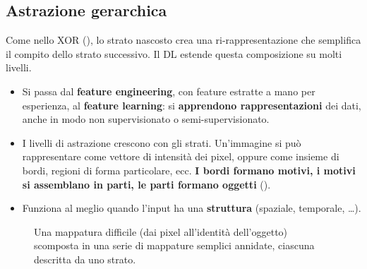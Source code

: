 \subsection{Astrazione gerarchica}

Come nello XOR (), lo strato nascosto crea una ri-rappresentazione che semplifica il compito dello
strato successivo. Il DL estende questa composizione su molti livelli.
\begin{itemize}
  \item Si passa dal \textbf{feature engineering}, con feature estratte a mano per esperienza, al \textbf{feature
        learning}: si \textbf{apprendono rappresentazioni} dei dati, anche in modo non supervisionato o
        semi-supervisionato.
  \item I livelli di astrazione crescono con gli strati. Un'immagine si può rappresentare come vettore di
        intensità dei pixel, oppure come insieme di bordi, regioni di forma particolare, ecc. \textbf{I bordi
        formano motivi, i motivi si assemblano in parti, le parti formano oggetti} ().
  \item Funziona al meglio quando l'input ha una \textbf{struttura} (spaziale, temporale, \dots).
\end{itemize}

\begin{figure}[ht]
\centering
{}
\caption{Una mappatura difficile (dai pixel all'identità dell'oggetto) scomposta in una serie di mappature semplici
annidate, ciascuna descritta da uno strato.}
\label{fig:gerarchia}
\end{figure}

